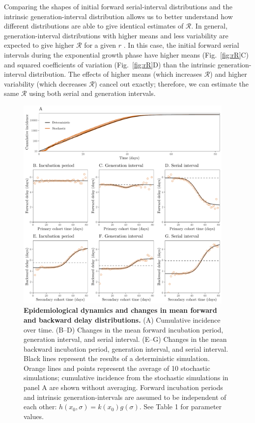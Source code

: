 \documentclass[12pt]{article}
\newcommand{\fref}[1]{Fig.~\ref{fig:#1}}
\begin{document}
Comparing the shapes of initial forward serial-interval distributions and the intrinsic generation-interval distribution allows us to better understand how different distributions are able to give identical estimates of $\mathcal R$.
In general, generation-interval distributions with higher means and less variability are expected to give higher $\mathcal R$ for a given $r$ \citep{wallinga2007generation, park2019practical}.
In this case, the initial forward serial intervals during the exponential growth phase have higher means (\fref{rR}C) and squared coefficients of variation (\fref{rR}D) than the intrinsic generation-interval distribution.
The effects of higher means (which increases $\mathcal R$) and higher variability (which decreases $\mathcal R$) cancel out exactly;
therefore, we can estimate the same $\mathcal R$ using both serial and generation intervals.

\begin{figure}[!ht]
\begin{center}
\includegraphics[width=0.95\textwidth]{forward.pdf}
\caption{
\textbf{Epidemiological dynamics and changes in mean forward and backward delay distributions.}
(A) Cumulative incidence over time.
(B--D) Changes in the mean forward incubation period, generation interval, and serial interval.
(E--G) Changes in the mean backward incubation period, generation interval, and serial interval.
Black lines represent the results of a deterministic simulation.
Orange lines and points represent the average of 10 stochastic simulations;
cumulative incidence from the stochastic simulations in panel A are shown without averaging.
Forward incubation periods and intrinsic generation-intervals are assumed to be independent of each other: $h(x_0, \sigma) = k(x_0) g(\sigma)$.
See Table 1 for parameter values.
}
\end{center}
\label{fig:epi}
\end{figure}
\end{document}
